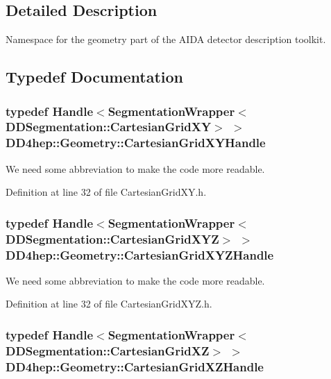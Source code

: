 \subsection{Detailed Description}
Namespace for the geometry part of the AIDA detector description toolkit. 

\subsection{Typedef Documentation}
\hypertarget{namespace_d_d4hep_1_1_geometry_a3d6ee3d4ad1e20c15b726ca41f8f3b59}{
\subsubsection[{CartesianGridXYHandle}]{\setlength{\rightskip}{0pt plus 5cm}typedef {\bf Handle}$<${\bf SegmentationWrapper}$<${\bf DDSegmentation::CartesianGridXY}$>$ $>$ {\bf DD4hep::Geometry::CartesianGridXYHandle}}}
\label{namespace_d_d4hep_1_1_geometry_a3d6ee3d4ad1e20c15b726ca41f8f3b59}


We need some abbreviation to make the code more readable. 

Definition at line 32 of file CartesianGridXY.h.\hypertarget{namespace_d_d4hep_1_1_geometry_ae299410d519f2026e72fd36ea6967324}{
\subsubsection[{CartesianGridXYZHandle}]{\setlength{\rightskip}{0pt plus 5cm}typedef {\bf Handle}$<${\bf SegmentationWrapper}$<${\bf DDSegmentation::CartesianGridXYZ}$>$ $>$ {\bf DD4hep::Geometry::CartesianGridXYZHandle}}}
\label{namespace_d_d4hep_1_1_geometry_ae299410d519f2026e72fd36ea6967324}


We need some abbreviation to make the code more readable. 

Definition at line 32 of file CartesianGridXYZ.h.\hypertarget{namespace_d_d4hep_1_1_geometry_a3ae1751ca0d9c7d138f97af6c2caedbc}{
\subsubsection[{CartesianGridXZHandle}]{\setlength{\rightskip}{0pt plus 5cm}typedef {\bf Handle}$<${\bf SegmentationWrapper}$<${\bf DDSegmentation::CartesianGridXZ}$>$ $>$ {\bf DD4hep::Geometry::CartesianGridXZHandle}}}
\label{namespace_d_d4hep_1_1_geometry_a3ae1751ca0d9c7d138f97af6c2caedbc}


